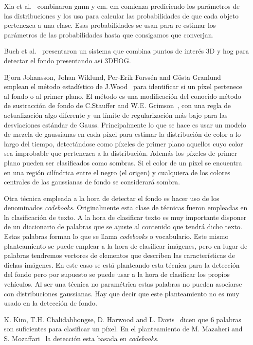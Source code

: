 Xia et al.~\cite{gmm_em_article} combinaron \acrshort{gmm} y \acrfull{em}. \acrshort{em} comienza prediciendo los parámetros de las distribuciones y los usa para calcular las probabilidades de que cada objeto pertenezca a una clase. Esas probabilidades se usan para re-estimar los parámetros de las probabilidades hasta que consigamos que converjan. 

Buch et al.~\cite{3dhog_article}  presentaron un sistema que combina  puntos de interés 3D y \acrfull{hog} para detectar el fondo presentando así 3DHOG.


Bjorn Johansson, Johan Wiklund, Per-Erik Forssén and Gösta  Granlund~\cite{combining_shadow} emplean el método estadístico de J.Wood~\cite{wood} para identificar si un píxel pertenece al fondo o al primer plano. El método es una modificación del conocido método de sustracción de fondo de  C.Stauffer and  W.E.  Grimson~\cite{adaptative_background}, con una regla de actualización algo diferente y un límite de regularización más bajo para las desviaciones estándar de Gauss. Principalmente lo que se hace es usar un modelo de mezcla de gaussianas en cada píxel para estimar la distribución de color a lo largo del tiempo, detectándose como píxeles de primer plano aquellos cuyo color sea improbable que pertenezca a la distribución. Además los píxeles de primer plano pueden ser clasificados como sombras. Si el color de un píxel se encuentra en una región cilíndrica entre el negro (el origen) y cualquiera de los colores centrales de las gaussianas de fondo se considerará sombra.


Otra técnica empleada a la hora de detectar el fondo es hacer uso de los denominados \textit{codebooks}. Originalmente esta clase de técnicas fueron empleadas en la clasificación de texto. A la hora de clasificar texto es muy importante disponer de un diccionario de palabras que se ajuste al contenido que tendrá dicho texto. Estas palabras forman lo que se llama  \textit{codebooks} o vocabulario. Este mismo planteamiento se puede emplear a la hora de clasificar imágenes, pero en lugar de palabras tendremos vectores de elementos que describen las características de dichas imágenes.
En este caso se está planteando esta técnica para la detección del fondo pero por supuesto se puede usar a la hora de clasificar los propios vehículos. Al ser una técnica no paramétrica estas palabras no pueden asociarse con distribuciones gaussianas. Hay que decir que este planteamiento no es muy usado en la detección de fondo.

K. Kim, T.H. Chalidabhongse, D. Harwood and L. Davis~\cite{real_time_foreground_background} dicen que 6 palabras son suficientes para clasificar un píxel. En el planteamiento de M. Mazaheri and S. Mozaffari~\cite{real_time_adaptative_background} la detección esta basada en \textit{codebooks}.

